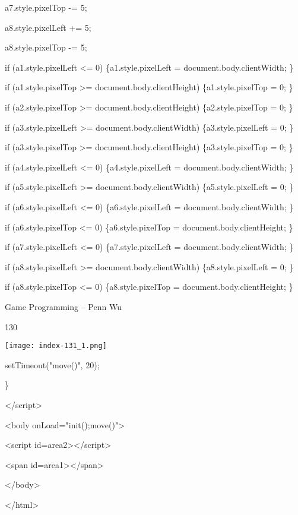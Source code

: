 \documentclass[
]{article}
\begin{document}
a7.style.pixelTop -= 5;

a8.style.pixelLeft += 5;

a8.style.pixelTop -= 5;

if (a1.style.pixelLeft \textless= 0) \{a1.style.pixelLeft =
document.body.clientWidth; \}

if (a1.style.pixelTop \textgreater= document.body.clientHeight)
\{a1.style.pixelTop = 0; \}

if (a2.style.pixelTop \textgreater= document.body.clientHeight)
\{a2.style.pixelTop = 0; \}

if (a3.style.pixelLeft \textgreater= document.body.clientWidth)
\{a3.style.pixelLeft = 0; \}

if (a3.style.pixelTop \textgreater= document.body.clientHeight)
\{a3.style.pixelTop = 0; \}

if (a4.style.pixelLeft \textless= 0) \{a4.style.pixelLeft =
document.body.clientWidth; \}

if (a5.style.pixelLeft \textgreater= document.body.clientWidth)
\{a5.style.pixelLeft = 0; \}

if (a6.style.pixelLeft \textless= 0) \{a6.style.pixelLeft =
document.body.clientWidth; \}

if (a6.style.pixelTop \textless= 0) \{a6.style.pixelTop =
document.body.clientHeight; \}

if (a7.style.pixelLeft \textless= 0) \{a7.style.pixelLeft =
document.body.clientWidth; \}

if (a8.style.pixelLeft \textgreater= document.body.clientWidth)
\{a8.style.pixelLeft = 0; \}

if (a8.style.pixelTop \textless= 0) \{a8.style.pixelTop =
document.body.clientHeight; \}

Game Programming -- Penn Wu

130

\protect\hypertarget{index_split_008.htmlux5cux23p131}{}{}\texttt{[image: index-131\_1.png]}

setTimeout("move()", 20);

\}

\textless/script\textgreater{}

\textless body onLoad="init();move()"\textgreater{}

\textless script id=area2\textgreater\textless/script\textgreater{}

\textless span id=area1\textgreater\textless/span\textgreater{}

\textless/body\textgreater{}

\textless/html\textgreater{}
\end{document}
